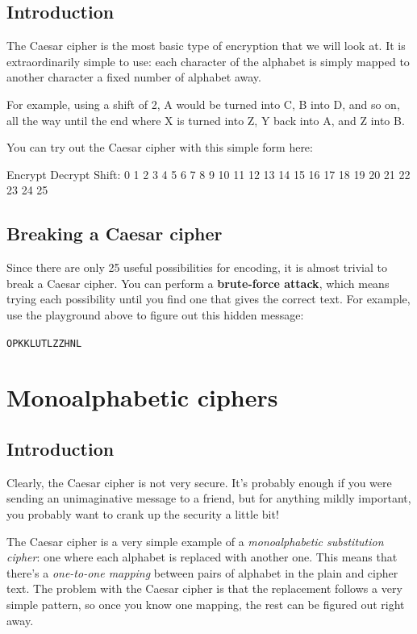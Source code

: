 \documentclass[
  letterpaper,
  DIV=11,
  numbers=noendperiod]{scrreprt}
\begin{document}
\hypertarget{introduction}{%
\section{Introduction}\label{introduction}}

The Caesar cipher is the most basic type of encryption that we will look
at. It is extraordinarily simple to use: each character of the alphabet
is simply mapped to another character a fixed number of alphabet away.

For example, using a shift of 2, A would be turned into C, B into D, and
so on, all the way until the end where X is turned into Z, Y back into
A, and Z into B.

You can try out the Caesar cipher with this simple form here:

Encrypt Decrypt Shift: 0 1 2 3 4 5 6 7 8 9 10 11 12 13 14 15 16 17 18 19
20 21 22 23 24 25

\hypertarget{breaking-a-caesar-cipher}{%
\section{Breaking a Caesar cipher}\label{breaking-a-caesar-cipher}}

Since there are only 25 useful possibilities for encoding, it is almost
trivial to break a Caesar cipher. You can perform a \textbf{brute-force
attack}, which means trying each possibility until you find one that
gives the correct text. For example, use the playground above to figure
out this hidden message:

\texttt{OPKKLUTLZZHNL}

\hypertarget{monoalphabetic-ciphers}{%
\chapter{Monoalphabetic ciphers}\label{monoalphabetic-ciphers}}

\hypertarget{introduction-1}{%
\section{Introduction}\label{introduction-1}}

Clearly, the Caesar cipher is not very secure. It's probably enough if
you were sending an unimaginative message to a friend, but for anything
mildly important, you probably want to crank up the security a little
bit!

The Caesar cipher is a very simple example of a \emph{monoalphabetic
substitution cipher}: one where each alphabet is replaced with another
one. This means that there's a \emph{one-to-one mapping} between pairs
of alphabet in the plain and cipher text. The problem with the Caesar
cipher is that the replacement follows a very simple pattern, so once
you know one mapping, the rest can be figured out right away.
\end{document}

